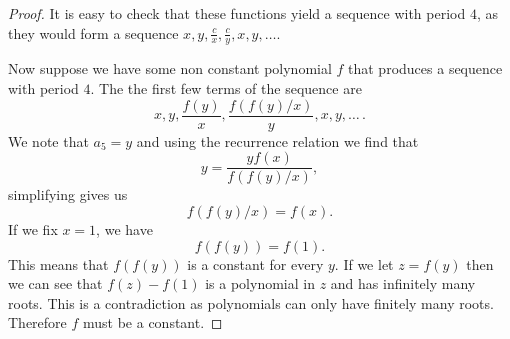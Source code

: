 \documentclass[12pt]{article}
\begin{document}
\begin{proof}
It is easy to check that these functions yield a sequence with period $4$, as they would form a sequence $x,y, \frac{c}{x}, \frac{c}{y}, x, y, \ldots$. 

Now suppose we have some non constant polynomial  $f$ that produces a sequence with period $4$. The  the first few terms of the sequence are 
\begin{equation*}
x, y, \dfrac{f(y)}{x}, \dfrac{f(f(y)/x)}{y}, x, y, \dots \, .
\end{equation*}
We note that $a_5 =y$ and using the recurrence relation we find that 
\begin{equation*}
 y = \dfrac{yf(x)}{f(f(y)/x)}, 
 \end{equation*}
simplifying gives us  
\begin{equation*}
 f(f(y)/x) = f(x).
\end{equation*}
If we fix $x = 1$, we have
\begin{equation*}
f(f(y)) = f(1). 
\end{equation*}
This means that $f(f(y))$ is a constant for every $y$. If we let $z=f(y)$ then we can see that $f(z)-f(1)$ is a polynomial in $z$ and has infinitely many roots. This is a contradiction as polynomials can only have finitely many roots. Therefore $f$ must be a constant. 
\end{proof}
\end{document}
